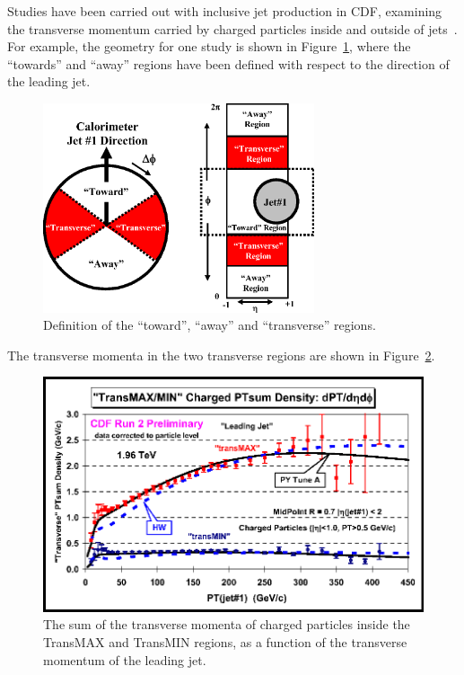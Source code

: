 \documentclass[12pt]{iopart}
\begin{document}
Studies have been carried out with inclusive jet production in CDF, examining the transverse momentum  carried  by charged particles
inside and outside of jets~\cite{Acosta:2004wq,Affolder:2001xt}. For example, the geometry for one study is shown in
Figure~\ref{fig:phase_space}, where the ``towards'' and ``away'' regions have been defined with respect to the direction of the leading
jet.
%
\begin{figure}[t]
\begin{center}
\includegraphics[width=8cm]{jet_transverse_con.eps}
\end{center}
\caption{
Definition of the ``toward'', ``away'' and ``transverse'' regions.
\label{fig:phase_space}}
\end{figure}
%
The transverse momenta in the two transverse regions are shown in Figure~\ref{fig:pttrack}.
%
\begin{figure}[t]
\begin{center}
\includegraphics[width=12cm]{LJ_PTsum_MAXMIN_CDFR2.eps}
\end{center}
\caption{
The sum of the transverse momenta of charged particles inside the TransMAX and TransMIN regions, as a function of the transverse
momentum of the leading jet.
\label{fig:pttrack}}
\end{figure}
%
\end{document}

